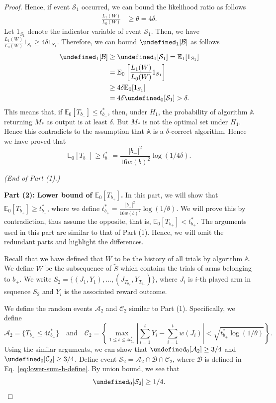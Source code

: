 \documentclass{article}
\newcommand{\E}{\mathbb E}
\let\Pr\undefined
\DeclareMathOperator{\Pr}{Pr}
\begin{document}
\begin{proof}
Hence, if event $\mathcal S_1$ occurred, we can bound the likelihood ratio as follows
\begin{align}
\frac{L_1(W)}{L_0(W)} &\ge \theta = 4\delta.
\end{align}
Let $1_{S_1}$ denote the indicator variable of event $\mathcal S_1$.
Then, we have $
\frac{L_1(W)}{L_0(W)} 1_{S_1} \ge 4\delta 1_{S_1}$.
Therefore, we can bound $\Pr_1[\mathcal B]$ as follows
\begin{align}
\Pr_1[\mathcal B] &\ge \Pr_1[\mathcal S_1] = \E_1[1_{S_1}] \nonumber \\
				  &= \E_0\left[\frac{L_1(W)}{L_0(W)} 1_{S_1}\right] \nonumber \\
				  &\ge 4\delta \E_0[1_{S_1}] \nonumber \\
				  &= 4\delta \Pr_0[\mathcal S_1] > \delta \label{eq:lower-sum-case-1-final}.
\end{align}
This means that, if $\E_0[T_{b_-}] \le t_{b_-}^*$, then, under $H_1$, the probability of algorithm $\mathbb A$ returning $M_*$ as output is at least $\delta$. 
But $M_*$ is not the optimal set under $H_1$. Hence this contradicts to the assumption that $\mathbb A$ is a $\delta$-correct algorithm.
Hence we have proved that 
\begin{equation}
\label{eq:lower-sum-case-1-a}
\E_0[T_{b_-}] \ge t_{b_-}^* = \frac{|b_-|^2}{16 w(b)^2}\log(1/4\delta).
\end{equation}

\emph{(End of Part (1).)}

\textbf{Part (2): Lower bound of $\E_0[T_{b_+}]$.} In this part, we will show that $\E_0[T_{b_+}]\ge t_{b_+}^*$, where we define $t_{b_+}^* = \frac{|b_+|^2}{16 w(b)^2}\log(1/\theta)$.
We will prove this by contradiction, thus assume the opposite, that is, $\E_0[T_{b_+}] < t_{b_+}^*$.
The arguments used in this part are similar to that of Part (1). 
Hence, we will omit the redundant parts and highlight the differences.

Recall that we have defined that $W$ to be the history of all trials by algorithm $\mathbb A$.
We define $W$ be the subsequence of $\tilde S$ which contains the trials of arms belonging to $b_+$.
We write $S_2=\{(J_1,Y_1),\ldots,(J_{T_{b_+}}, Y_{T_{b_+}})\}$, where $J_i$ is $i$-th played arm in sequence $S_2$ and $Y_i$ is the associated reward outcome.

We define the random events $\mathcal A_2$ and $\mathcal C_2$ similar to Part (1).
Specifically, we define 
$$
\mathcal A_2 = \{T_{b_+} \le 4t_{b_+}^* \} \quad\text{and}\quad
\mathcal C_2 = \left\{\max_{1\le t \le 4t_{b_+}^*} \left|\sum_{i=1}^t Y_i - \sum_{i=1}^t w(J_i)\right|  < \sqrt{t_{b_+}^*\log(1/\theta)} \right\}.
$$
Using the similar arguments, we can show that 
$\Pr_0[\mathcal A_2] \ge 3/4$ and $\Pr_0[\mathcal C_2] \ge 3/4$.
Define event $\mathcal S_2 = \mathcal A_2 \cap \mathcal B \cap \mathcal C_2$, where $\mathcal B$ is defined in Eq.~\eqref{eq:lower-sum-b-define}.
By union bound, we see that 
$$
\Pr_0[\mathcal S_2] \ge 1/4.
$$


\end{proof}
\end{document}
